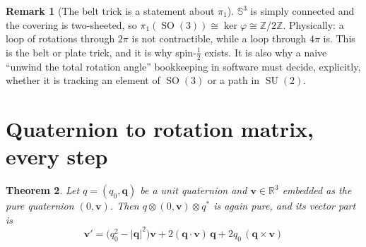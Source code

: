 \documentclass[11pt]{article}
\DeclareMathOperator{\SO}{SO}
\DeclareMathOperator{\SU}{SU}
\newcommand{\R}{\mathbb{R}}
\newcommand{\Z}{\mathbb{Z}}
\newcommand{\Sph}{\mathbb{S}}
\newcommand{\vv}[1]{\bm{#1}}
\theoremstyle{plain}
\newtheorem{theorem}{Theorem}[section]
\theoremstyle{definition}
\newtheorem{remark}[theorem]{Remark}
\begin{document}
\begin{remark}[The belt trick is a statement about $\pi_1$]
$\Sph^3$ is simply connected and the covering is two-sheeted, so
$\pi_1(\SO(3))\cong\ker\varphi\cong\Z/2\Z$. Physically: a loop of rotations through $2\pi$ is not
contractible, while a loop through $4\pi$ is. This is the belt or plate trick, and it is why
spin-$\tfrac12$ exists. It is also why a naive ``unwind the total rotation angle'' bookkeeping in
software must decide, explicitly, whether it is tracking an element of $\SO(3)$ or a path in
$\SU(2)$.
\end{remark}

\section{Quaternion to rotation matrix, every step}

\begin{theorem}\label{thm:sandwich}
Let $q=(q_0,\vv q)$ be a unit quaternion and $\vv v\in\R^3$ embedded as the pure quaternion
$(0,\vv v)$. Then $q\otimes(0,\vv v)\otimes q^{*}$ is again pure, and its vector part is
\[
\boxed{\ \vv v'=\big(q_0^2-|\vv q|^2\big)\vv v+2(\vv q\cdot\vv v)\,\vv q+2q_0\,(\vv q\times\vv v)\ }
\]
\end{theorem}
\end{document}
